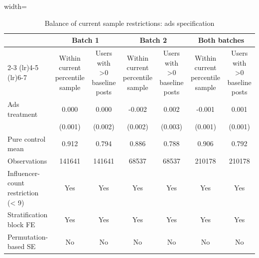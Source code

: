 \begin{table}[!htbp]
    \centering
    \caption{Balance of current sample restrictions: ads specification}
    \label{tab:sample_restrictions_ads}
    \scriptsize
    \begin{adjustbox}{width=\textwidth}
    \begin{tabular}{lcccccc}
    \toprule
     & \multicolumn{2}{c}{Batch 1} & \multicolumn{2}{c}{Batch 2} & \multicolumn{2}{c}{Both batches} \\
    \cmidrule(lr){2-3} \cmidrule(lr){4-5} \cmidrule(lr){6-7}
     & Within current percentile sample & Users with >0 baseline posts & Within current percentile sample & Users with >0 baseline posts & Within current percentile sample & Users with >0 baseline posts \\
    \midrule
    Ads treatment & 0.000 & 0.000 & -0.002 & 0.002 & -0.001 & 0.001 \\
     & (0.001) & (0.002) & (0.002) & (0.003) & (0.001) & (0.001) \\
    Pure control mean & 0.912 & 0.794 & 0.886 & 0.788 & 0.906 & 0.792 \\
    Observations & 141641 & 141641 & 68537 & 68537 & 210178 & 210178 \\
    Influencer-count restriction (< 9) & Yes & Yes & Yes & Yes & Yes & Yes \\
    Stratification block FE & Yes & Yes & Yes & Yes & Yes & Yes \\
    Permutation-based SE & No & No & No & No & No & No \\
    \bottomrule
    \end{tabular}
    \end{adjustbox}
\end{table}
